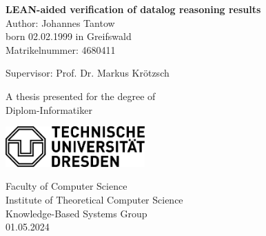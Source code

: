 \begin{titlepage}
    \begin{center}
        \vspace*{1cm}
            
        \Huge
        \textbf{LEAN-aided verification of datalog reasoning results}\\
        \vspace{1.5cm}
        \Large
        Author: Johannes Tantow \\
        born 02.02.1999 in Greifswald\\
        Matrikelnummer: 4680411
        
        \vspace{1cm}
        Supervisor: Prof. Dr. Markus Krötzsch
        \vfill
            
        A thesis presented for the degree of\\
        Diplom-Informatiker
            
        \vspace{0.8cm}
        \begin{center}
        \includegraphics[width=0.4\textwidth]{TUD_Logo_schwarz_80.png}
        \end{center}
        \vspace{0.8cm}
        \Large
        Faculty of Computer Science\\
        Institute of Theoretical Computer Science\\
        Knowledge-Based Systems Group\\
        01.05.2024
            
    \end{center}
\end{titlepage}